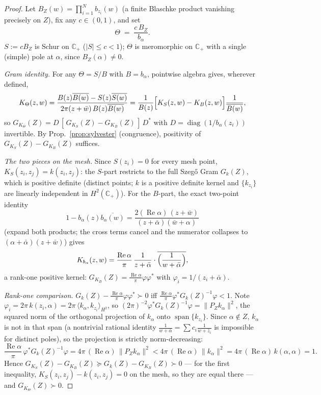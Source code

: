 \documentclass[11pt]{article}
\theoremstyle{definition}
\theoremstyle{remark}
\newcommand{\CP}{\mathbb{C}_{+}}
\newcommand{\re}{\operatorname{Re}}
\begin{document}
\begin{proof}
Let $B_Z(w)=\prod_{i=1}^{N}b_{z_i}(w)$ (a finite Blaschke product vanishing
precisely on $Z$), fix any $c\in(0,1)$, and set
\[
\Theta\;=\;\frac{c\,B_Z}{b_{\alpha}} .
\]
$S:=cB_Z$ is Schur on $\CP$ ($|S|\le c<1$); $\Theta$ is meromorphic on $\CP$
with a single (simple) pole at $\alpha$, since $B_Z(\alpha)\neq0$.

\emph{Gram identity.} For any $\Theta=S/B$ with $B=b_\alpha$, pointwise
algebra gives, wherever defined,
\begin{equation}\label{eq:gram-split}
K_{\Theta}(z,w)
=\frac{B(z)\overline{B(w)}-S(z)\overline{S(w)}}{2\pi(z+\bar w)\,B(z)\overline{B(w)}}
=\frac{1}{B(z)}\Bigl[K_S(z,w)-K_B(z,w)\Bigr]\frac{1}{\overline{B(w)}} ,
\end{equation}
so $G_{K_\Theta}(Z)=D\,[\,G_{K_S}(Z)-G_{K_B}(Z)\,]\,D^{*}$ with
$D=\operatorname{diag}(1/b_\alpha(z_i))$ invertible. By
Prop.~\ref{prop:sylvester} (congruence), positivity of
$G_{K_S}(Z)-G_{K_B}(Z)$ suffices.

\emph{The two pieces on the mesh.} Since $S(z_i)=0$ for every mesh point,
$K_S(z_i,z_j)=k(z_i,z_j)$: the $S$-part restricts to the full Szeg\H{o} Gram
$G_k(Z)$, which is positive definite (distinct points; $k$ is a positive
definite kernel and $\{k_{z_i}\}$ are linearly independent in $H^2(\CP)$).
For the $B$-part, the exact two-point identity
\begin{equation}\label{eq:two-point}
1-b_{\alpha}(z)\overline{b_{\alpha}(w)}
=\frac{2(\re\alpha)\,(z+\bar w)}{(z+\bar\alpha)(\bar w+\alpha)}
\end{equation}
(expand both products; the cross terms cancel and the numerator collapses to
$(\alpha+\bar\alpha)(z+\bar w)$) gives
\[
K_{b_\alpha}(z,w)=\frac{\re\alpha}{\pi}\,
\frac{1}{z+\bar\alpha}\cdot\overline{\Bigl(\frac{1}{w+\bar\alpha}\Bigr)} ,
\]
a rank-one positive kernel: $G_{K_B}(Z)=\frac{\re\alpha}{\pi}\varphi\varphi^{*}$
with $\varphi_i=1/(z_i+\bar\alpha)$.

\emph{Rank-one comparison.} $G_k(Z)-\frac{\re\alpha}{\pi}\varphi\varphi^{*}\succ0$
iff $\frac{\re\alpha}{\pi}\varphi^{*}G_k(Z)^{-1}\varphi<1$. Note
$\varphi_i=2\pi\,k(z_i,\alpha)=2\pi\,\langle k_\alpha,k_{z_i}\rangle_{H^2}$,
so $(2\pi)^{-2}\varphi^{*}G_k(Z)^{-1}\varphi=\|P_Z k_\alpha\|^2$, the squared
norm of the orthogonal projection of $k_\alpha$ onto
$\operatorname{span}\{k_{z_i}\}$. Since $\alpha\notin Z$, $k_\alpha$ is not in
that span (a nontrivial rational identity
$\frac{1}{w+\bar\alpha}=\sum c_i\frac{1}{w+\bar z_i}$ is impossible for
distinct poles), so the projection is strictly norm-decreasing:
\[
\frac{\re\alpha}{\pi}\,\varphi^{*}G_k(Z)^{-1}\varphi
=4\pi\,(\re\alpha)\,\|P_Z k_\alpha\|^{2}
<4\pi\,(\re\alpha)\,\|k_\alpha\|^{2}
=4\pi\,(\re\alpha)\,k(\alpha,\alpha)=1 .
\]
Hence $G_{K_S}(Z)-G_{K_B}(Z)\succeq G_k(Z)-G_{K_B}(Z)\succ0$ --- for the
first inequality, $K_S(z_i,z_j)-k(z_i,z_j)=0$ on the mesh, so they are equal
there --- and $G_{K_\Theta}(Z)\succ0$.


\end{proof}
\end{document}
